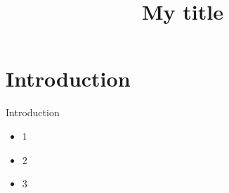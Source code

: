 \documentclass[bigger]{beamer}
\title[...]{My title}
\begin{document}
    \begin{frame}[plain]
        \begin{minipage}[b][15mm][t]{200mm}
         \end{minipage}
    \end{frame}

    \section{Introduction}

{
%
\begin{frame}{ Introduction}
\begin{itemize}
\item 1
\item 2
\item 3
\end{itemize}
\end{frame}
}

{
%
\begin{frame}{ }

\end{frame}
}
\end{document}
